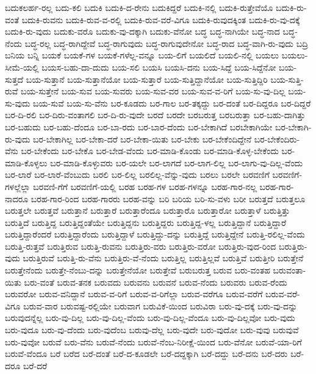 {ಬದುಕಲರ್ಹ-ರಲ್ಲ
ಬದು-ಕಲಿ
ಬದುಕಿ
ಬದುಕಿ-ದ-ರೇನು
ಬದುಕಿದ್ದರೆ
ಬದುಕಿ-ನಲ್ಲಿ
ಬದುಕಿ-ರುತ್ತೇವೆಯೊ
ಬದುಕಿ-ರು-ವಂತೆ
ಬದುಕಿ-ರುವನು
ಬದುಕಿ-ರುವ-ವ-ರಲ್ಲಿ
ಬದುಕಿ-ರುವ-ವರೆ-ವಿಗೂ
ಬದುಕಿ-ರುವುದಕ್ಕಿಂತ
ಬದುಕಿ-ರು-ವು-ದಕ್ಕೆ
ಬದುಕಿ-ರು-ವುದು
ಬದುಕು-ವರೊ
ಬದುಕು-ವು-ದಕ್ಕಾಗಿ
ಬದುಕು-ವೆನೋ
ಬದ್ಧ
ಬದ್ಧ-ನಾಗಿಯೇ
ಬದ್ಧ-ನಾದ
ಬದ್ಧ-ನೆಂದು
ಬದ್ಧ-ರಲ್ಲ
ಬದ್ಧ-ರಾಗಿದ್ದೇವೆ
ಬದ್ಧ-ರಾಗುವುದು
ಬದ್ಧ-ರಾಗುವುದೇನೋ
ಬದ್ಧ-ರಾದ
ಬದ್ಧ-ವಾಗಿ-ರು-ವುದು
ಬದ್ರಿ
ಬನಿಯ
ಬನ್ನಿ
ಬಯಕೆ
ಬಯಕೆ-ಗಳ
ಬಯಕೆ-ಗಳೆಲ್ಲ-ವನ್ನೂ
ಬಯ-ಲಿಗೆ
ಬಯಲಿದೆ
ಬಯಲಿ-ನಲ್ಲಿ
ಬಯಲು
ಬಯಲು-ಸೀಮೆ-ಯಲ್ಲಿ
ಬಯಸ-ಬಹು-ದಾ-ದುದು
ಬಯ-ಸಲಿ
ಬಯಸಿ
ಬಯಸಿ-ದನು
ಬಯ-ಸಿದ್ದೆ
ಬಯ-ಸಿದ್ದೆನೋ
ಬಯ-ಸುತ್ತದೆ
ಬಯ-ಸುತ್ತಾನೆ
ಬಯ-ಸುತ್ತಾನೆಯೋ
ಬಯ-ಸುತ್ತಾರೆ
ಬಯ-ಸುತ್ತಿದ್ದಾನೆಯೋ
ಬಯ-ಸುತ್ತಿದ್ದಿರಿ
ಬಯ-ಸುತ್ತಿ-ರುವೆ
ಬಯ-ಸುತ್ತೇನೆ
ಬಯ-ಸುವ
ಬಯ-ಸುವರು
ಬಯ-ಸುವ-ವರ
ಬಯ-ಸುವ-ವ-ರಿಗೆ
ಬಯ-ಸು-ವು-ದಿಲ್ಲ
ಬಯ-ಸು-ವುದು
ಬಯ-ಸುವೆ
ಬಯ-ಸು-ವೆನು
ಬರ-ಕೂಡದು
ಬರ-ಗಾಲ
ಬರ-ತಕ್ಕದ್ದು
ಬರ-ದಂತೆ
ಬರ-ದಿದ್ದರೂ
ಬರ-ದಿದ್ದರೆ
ಬರ-ದಿ-ರಲಿ
ಬರ-ದಿರು-ವಂತಾಗಲಿ
ಬರ-ದಿ-ರು-ವುದೇ
ಬರದೆ
ಬರದೇ
ಬರಬರುತ್ತ
ಬರಬರುತ್ತಾ
ಬರ-ಬಹು-ದಾಗಿತ್ತು
ಬರ-ಬಹುದು
ಬರ-ಬಹು-ದೆಂದೂ
ಬರ-ಬಾ-ರದು
ಬರ-ಬಾರ-ದೆಂದು
ಬರ-ಬೇಕಾಗಿದೆ
ಬರಬೇಕಾಗಿಯೇ
ಬರ-ಬೇಕಾಗಿ-ರು-ವುದು
ಬರ-ಬೇಕಾಗಿಲ್ಲ
ಬರ-ಬೇಕಾ-ದರೆ
ಬರ-ಬೇಕಾ-ಯಿತು
ಬರ-ಬೇಕು
ಬರ-ಬೇಕೆಂದಿದ್ದೇನೆ
ಬರ-ಬೇಕೆಂದಿರು-ವೆನು
ಬರ-ಬೇಕೆಂದು
ಬರ-ಬೇಕೊ
ಬರ-ಬೇಡ-ವೆಂದು
ಬರ-ಮಾಡಿ-ಕೊಂಡು
ಬರ-ಮಾಡಿ-ಕೊಳ್ಳ-ಬೇಕೆಂದು
ಬರ-ಮಾಡಿ-ಕೊಳ್ಳಲು
ಬರ-ಮಾಡಿ-ಕೊಳ್ಳುವರು
ಬರ-ಯಲೇ
ಬರ-ಲಾಗದೆ
ಬರ-ಲಾಗ-ಲಿಲ್ಲ
ಬರ-ಲಾಗು-ವು-ದಿಲ್ಲ-ವೆಂದು
ಬರ-ಲಾರೆ
ಬರ-ಲಾರೆ-ವೆಂಬುದು
ಬರಲಿ
ಬರ-ಲಿಲ್ಲ
ಬರಲಿಲ್ಲ-ವೆನ್ನು-ವುದು
ಬರಲು
ಬರಲೇ
ಬರವಣಿಗೆ
ಬರವಣಿಗೆ-ಗಳಲ್ಲೆಲ್ಲಾ
ಬರವಣಿ-ಗೆಗೆ
ಬರವಣಿಗೆ-ಯಲ್ಲಿ
ಬರಹ
ಬರಹ-ಗಳ
ಬರಹ-ಗಳನ್ನೂ
ಬರಹ-ಗಾರ-ನಲ್ಲ
ಬರಹ-ಗಾರ-ನಾದರೂ
ಬರಹ-ಗಾರ-ರಿಂದ
ಬರಹ-ಗಾರರು
ಬರಹ-ವನ್ನು
ಬರಿ
ಬರಿಯ
ಬರಿ-ಸು-ವಳು
ಬರೀ
ಬರುತ್ತದೆ
ಬರುತ್ತಲೂ
ಬರುತ್ತಲೇ
ಬರುತ್ತವೆ
ಬರುತ್ತಾನೆ
ಬರುತ್ತಾರೆ
ಬರುತ್ತಾರೆಂದೂ
ಬರುತ್ತಾರೊ
ಬರುತ್ತಾರೋ
ಬರುತ್ತಾಳೆ
ಬರುತ್ತಿತ್ತು
ಬರುತ್ತಿದೆ
ಬರುತ್ತಿದ್ದ
ಬರುತ್ತಿದ್ದಂತೆಯೇ
ಬರುತ್ತಿದ್ದನು
ಬರುತ್ತಿದ್ದರು
ಬರುತ್ತಿದ್ದ-ಳಲ್ಲ
ಬರುತ್ತಿದ್ದಾನೆ
ಬರುತ್ತಿದ್ದಾರೆ
ಬರುತ್ತಿದ್ದಾರೆಂದರೆ
ಬರುತ್ತಿದ್ದಾರೆಂದು
ಬರುತ್ತಿದ್ದಾಳೆ
ಬರುತ್ತಿದ್ದು-ದನ್ನು
ಬರುತ್ತಿದ್ದೆ
ಬರುತ್ತಿದ್ದೇನೆ
ಬರುತ್ತಿ-ರಲಿಲ್ಲ-ವೆಂದು
ಬರುತ್ತಿ-ರುತ್ತವೆ
ಬರುತ್ತಿರುವ
ಬರುತ್ತಿ-ರುವನು
ಬರುತ್ತಿರು-ವರು
ಬರುತ್ತಿರು-ವರೋ
ಬರುತ್ತಿರು-ವುದ-ರಿಂದ
ಬರುತ್ತಿರು-ವುದು
ಬರುತ್ತಿರುವೆ
ಬರುತ್ತಿ-ರು-ವೆನು
ಬರುತ್ತಿರು-ವೆ-ನೆಂದು
ಬರುತ್ತಿಲ್ಲ
ಬರುತ್ತಿಲ್ಲವೆ
ಬರುತ್ತಿವೆ
ಬರುತ್ತೀರಿ
ಬರುತ್ತೇನೆ
ಬರುತ್ತೇನೆಂದು
ಬರುತ್ತೇ-ನೆಂಬು-ದನ್ನು
ಬರುತ್ತೇನೆಯೋ
ಬರುತ್ತೇವೆ
ಬರುಬರುತ್ತ
ಬರುವ
ಬರು-ವಂತಹ
ಬರುವಂತಾ-ಯಿತು
ಬರು-ವಂತೆ
ಬರುವ-ತನಕ
ಬರುವದು
ಬರುವನು
ಬರುವನೆ
ಬರುವ-ನೆಂದು
ಬರುವರು
ಬರುವ-ರೆಂದು
ಬರುವರೋ
ಬರುವ-ವನಿದ್ದಾನೆ
ಬರುವ-ವ-ರಿಗೆ
ಬರುವ-ವ-ರಿಗೆಲ್ಲಾ
ಬರುವ-ವರೆಗೂ
ಬರುವ-ವರೆಗೆ
ಬರುವ-ವರೆ-ವಿಗೂ
ಬರುವ-ವಾರ
ಬರುವಷ್ಟ-ರಲ್ಲಿಯೇ
ಬರುವಾಗ
ಬರುವಿಕೆ-ಯಿಂದ
ಬರುವಿರಾ
ಬರು-ವು-ದಕ್ಕೆ
ಬರು-ವು-ದನ್ನು
ಬರುವುದನ್ನೆಲ್ಲ
ಬರು-ವು-ದಿಲ್ಲ
ಬರು-ವು-ದಿಲ್ಲ-ವೆಂದು
ಬರು-ವು-ದಿಲ್ಲ-ವೆಂದೂ
ಬರು-ವು-ದಿಲ್ಲವೋ
ಬರು-ವುದು
ಬರು-ವುದೂ
ಬರು-ವು-ದೆಂದು
ಬರು-ವುದೆಂಬ
ಬರುವು-ದೆಲ್ಲ
ಬರು-ವುದೇ
ಬರು-ವುದೋ
ಬರು-ವುವು
ಬರುವುವೆ
ಬರು-ವುವೋ
ಬರುವೆ
ಬರು-ವೆನು
ಬರುವೆ-ನೆಂದು
ಬರುವೆ-ನೆಂಬ-ನಿರೀಕ್ಷೆ-ಯಿಂದ
ಬರು-ವೆನೋ
ಬರುವೆ-ಯಾ-ರಿಗೆ
ಬರುವೆ-ವೆಂದೂ
ಬರೆ
ಬರೆದ
ಬರೆ-ದಂತೆ
ಬರೆ-ದ-ಕೂಡಲೇ
ಬರೆ-ದದ್ದಕ್ಕಾಗಿ
ಬರೆ-ದದ್ದು
ಬರೆ-ದನು
ಬರೆ-ದರು
ಬರೆ-ದರೂ
ಬರೆ-ದರೆ
}
